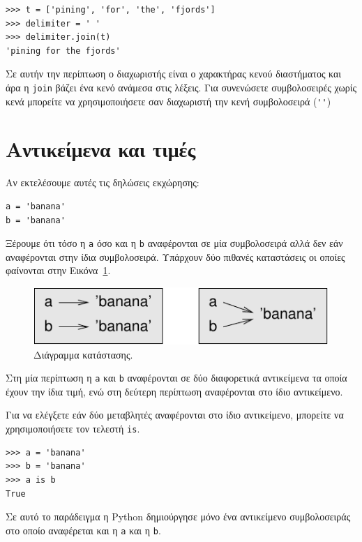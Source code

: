 \documentclass[10pt]{book}
\begin{document}
\begin{verbatim}
>>> t = ['pining', 'for', 'the', 'fjords']
>>> delimiter = ' '
>>> delimiter.join(t)
'pining for the fjords'
\end{verbatim}
%
Σε αυτήν την περίπτωση ο διαχωριστής είναι ο χαρακτήρας κενού διαστήματος και άρα η {\tt join} βάζει ένα κενό ανάμεσα στις λέξεις. Για συνενώσετε συμβολοσειρές χωρίς κενά μπορείτε να χρησιμοποιήσετε σαν διαχωριστή την κενή συμβολοσειρά (\verb"''") 


\section{Αντικείμενα και τιμές}

Αν εκτελέσουμε αυτές τις δηλώσεις εκχώρησης:

\begin{verbatim}
a = 'banana'
b = 'banana'
\end{verbatim}
%

Ξέρουμε ότι τόσο η {\tt a} όσο και η {\tt b} αναφέρονται σε μία συμβολοσειρά αλλά δεν εάν αναφέρονται στην ίδια συμβολοσειρά. Υπάρχουν δύο πιθανές καταστάσεις οι οποίες φαίνονται στην Εικόνα~\ref{fig.list1}.

\begin{figure}
\centerline
{\includegraphics[scale=0.8]{figs/list1.pdf}}
 \caption{Διάγραμμα κατάστασης.} 
\label{fig.list1}
\end{figure}


Στη μία περίπτωση η {\tt a} και {\tt b} αναφέρονται σε δύο διαφορετικά αντικείμενα τα οποία έχουν την ίδια τιμή, ενώ στη δεύτερη περίπτωση αναφέρονται στο ίδιο αντικείμενο.

Για να ελέγξετε εάν δύο μεταβλητές αναφέρονται στο ίδιο αντικείμενο, μπορείτε να χρησιμοποιήσετε τον τελεστή {\tt is}.

\begin{verbatim}
>>> a = 'banana'
>>> b = 'banana'
>>> a is b
True
\end{verbatim}
%

Σε αυτό το παράδειγμα η  Python  δημιούργησε μόνο ένα αντικείμενο συμβολοσειράς στο οποίο αναφέρεται και η {\tt a} και η {\tt b}.
\end{document}
